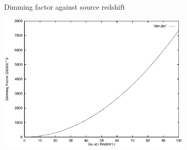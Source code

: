 \documentclass[aspectratio=1610,xcolor=dvipsnames,t]{beamer}
\begin{document}
\begin{frame}{Dimming factor against source redshift}
    \begin{center}
        \includegraphics[width=0.7\textwidth]{results/dim.eps}
    \end{center}
\end{frame} 


\end{document}
